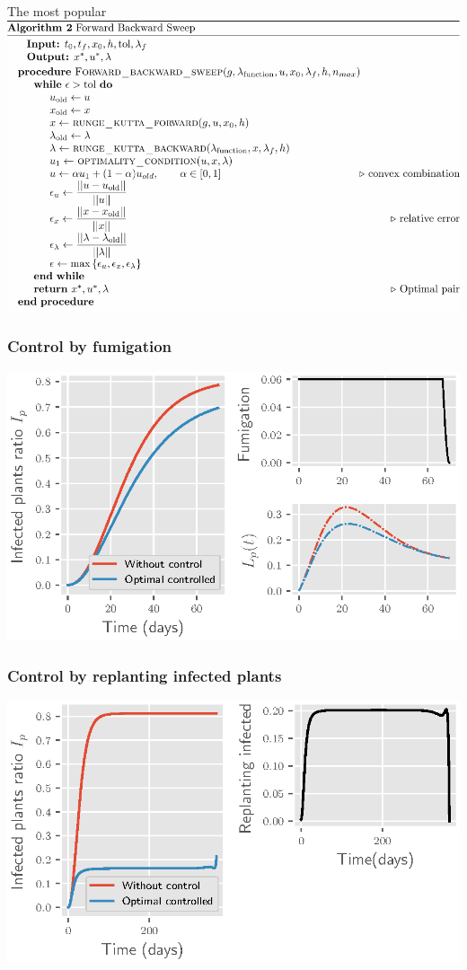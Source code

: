 \begin{frame}{The most popular}
    \includegraphics[width=1\linewidth]{assets/fbs_algorithm.pdf}
\end{frame}
\begin{frame}
    \frametitle{Control by fumigation}
    \begin{center}
        \includegraphics{numerical_results/figure_1_tylc_only_control_fumigation}
    \end{center}
\end{frame}
%
\begin{frame}
    \frametitle{Control by replanting infected plants}
    \begin{center}
        \includegraphics{numerical_results/figure_1_tomato_controlled_by_replanting_infected}
    \end{center}
\end{frame}
